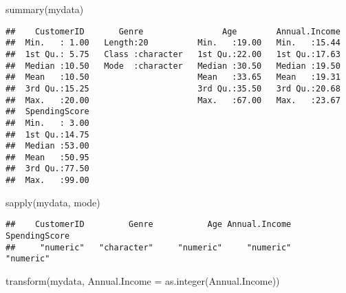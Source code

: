 \documentclass[
]{article}
\newenvironment{Shaded}{\begin{snugshade}}{\end{snugshade}}
\newcommand{\AttributeTok}[1]{\textcolor[rgb]{0.77,0.63,0.00}{#1}}
\newcommand{\FunctionTok}[1]{\textcolor[rgb]{0.00,0.00,0.00}{#1}}
\newcommand{\NormalTok}[1]{#1}
\begin{document}
\begin{Shaded}
\begin{Highlighting}[]
\FunctionTok{summary}\NormalTok{(mydata)}
\end{Highlighting}
\end{Shaded}

\begin{verbatim}
##    CustomerID       Genre                Age        Annual.Income  
##  Min.   : 1.00   Length:20          Min.   :19.00   Min.   :15.44  
##  1st Qu.: 5.75   Class :character   1st Qu.:22.00   1st Qu.:17.63  
##  Median :10.50   Mode  :character   Median :30.50   Median :19.50  
##  Mean   :10.50                      Mean   :33.65   Mean   :19.31  
##  3rd Qu.:15.25                      3rd Qu.:35.50   3rd Qu.:20.68  
##  Max.   :20.00                      Max.   :67.00   Max.   :23.67  
##  SpendingScore  
##  Min.   : 3.00  
##  1st Qu.:14.75  
##  Median :53.00  
##  Mean   :50.95  
##  3rd Qu.:77.50  
##  Max.   :99.00
\end{verbatim}

\begin{Shaded}
\begin{Highlighting}[]
\FunctionTok{sapply}\NormalTok{(mydata, mode)}
\end{Highlighting}
\end{Shaded}

\begin{verbatim}
##    CustomerID         Genre           Age Annual.Income SpendingScore 
##     "numeric"   "character"     "numeric"     "numeric"     "numeric"
\end{verbatim}

\begin{Shaded}
\begin{Highlighting}[]
\FunctionTok{transform}\NormalTok{(mydata, }\AttributeTok{Annual.Income =} \FunctionTok{as.integer}\NormalTok{(Annual.Income))}
\end{Highlighting}
\end{Shaded}
\end{document}
